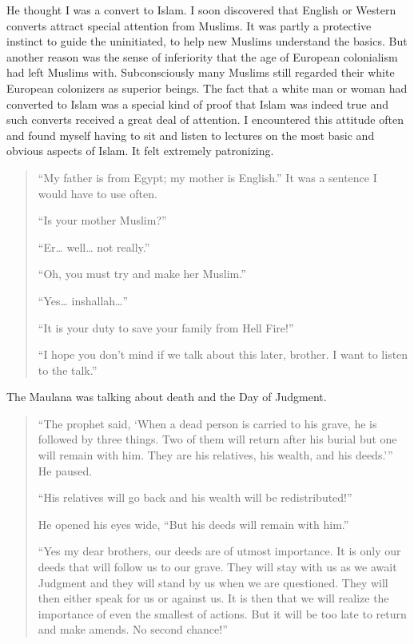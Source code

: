 \documentclass[12pt]{memoir}
\newcommand{\cor}[2]{#2} %
\begin{document}
He thought I was a convert to Islam.
I soon discovered that English or Western converts
attract special attention from Muslims.
It was partly a protective instinct to guide the uninitiated,
to help new Muslims understand the basics.
But another reason was the sense of inferiority
that the age of European colonialism had left Muslims with.
Subconsciously many Muslims still regarded
their white European colonizers as superior beings.
The fact that a white man or woman had converted to Islam
was a special kind of proof that Islam was indeed true
and such converts received a great deal of attention.
I encountered this attitude often and found myself having to sit
and listen to lectures on the most basic and obvious aspects of Islam.
It felt extremely patronizing.

\begin{quote}
“My father is from Egypt; my mother is English.”
It was a sentence I would have to use often.

“Is your mother Muslim?”

“Er… well… not really.”

“Oh, you must try and make her Muslim.”

“Yes… inshallah…”

“It is your duty to save your family from Hell Fire!”

“I hope you don’t mind if we talk about this later, brother.
I want to listen to the talk.”
\end{quote}

The Maulana was talking about death and the Day of Judgment.

\begin{quote}
“The prophet said,
‘When a dead person is carried to his grave,
he is followed by three things.
Two of them will return after his burial but one will remain with him.
They are his relatives, his wealth, and his deeds.’”
He paused.

“His relatives will go back
and his wealth will be \cor{re-distributed}{redistributed}!”

He opened his eyes wide, “But his deeds will remain with him.”

“Yes my dear brothers, our deeds are of utmost importance.
It is only our deeds that will follow us to our grave.
They will stay with us as we await Judgment
and they will stand by us when we are questioned.
They will then either speak for us or against us.
It is then that we will realize the importance of even the smallest of actions.
But it will be too late to return and make amends.
No second chance!”
\end{quote}
\end{document}
